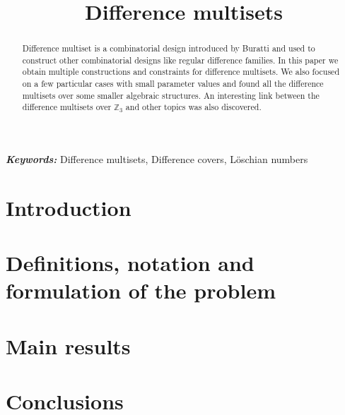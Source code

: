 \documentclass{article}
\title{Difference multisets}
\date{}
\author{}
\theoremstyle{plain}
\theoremstyle{definition}
\theoremstyle{remark}
\providecommand{\keywords}[1]{\textbf{\textit{Keywords: }} #1}
\begin{document}
	\maketitle
	
	\begin{abstract}
		Difference multiset is a combinatorial design introduced by Buratti \cite{buratti1999old} and used to construct other combinatorial designs like regular difference families. In this paper we obtain multiple constructions and constraints for difference multisets. We also focused on a few particular cases with small parameter values and found all the difference multisets over some smaller algebraic structures. An interesting link between the difference multisets over $\mathbb Z_3$ and other topics was also discovered.
	\end{abstract}
	
	\keywords{Difference multisets, Difference covers, Löschian numbers}
    
    \section{Introduction}
    
     
	\section{Definitions, notation and formulation of the problem}
    
	
    \section{Main results}
    

    \section{Conclusions}
    
    
	
	 
	
\end{document}
